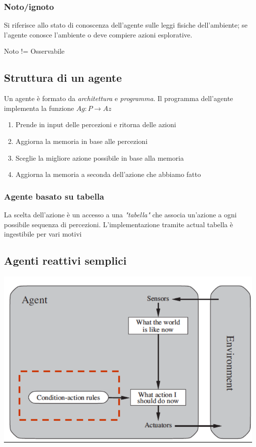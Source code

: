 \documentclass{article}
\begin{document}
\subsubsection{Noto/ignoto}
\par Si riferisce allo stato di conoscenza dell'agente sulle leggi fisiche dell'ambiente; se l'agente conosce l'ambiente o deve compiere azioni esplorative.

Noto != Osservabile

\subsection{Struttura di un agente}
Un agente è formato da \textit{architettura} e \textit{programma}. 
Il programma dell'agente implementa la funzione \(Ag: P \rightarrow Az\) 
\begin{enumerate}
    \item Prende in input delle percezioni e ritorna delle azioni
    \item Aggiorna la memoria in base alle percezioni
    \item Sceglie la migliore azione possibile in base alla memoria
    \item Aggiorna la memoria a seconda dell'azione che abbiamo fatto
\end{enumerate}
\subsubsection{Agente basato su tabella}
La scelta dell'azione è un accesso a una \textit{"tabella"} che associa un'azione a ogni possibile sequenza di percezioni. L'implementazione tramite actual tabella è ingestibile per vari motivi

\subsection{Agenti reattivi semplici}

\includegraphics[width = \linewidth]{3.png}
\end{document}

